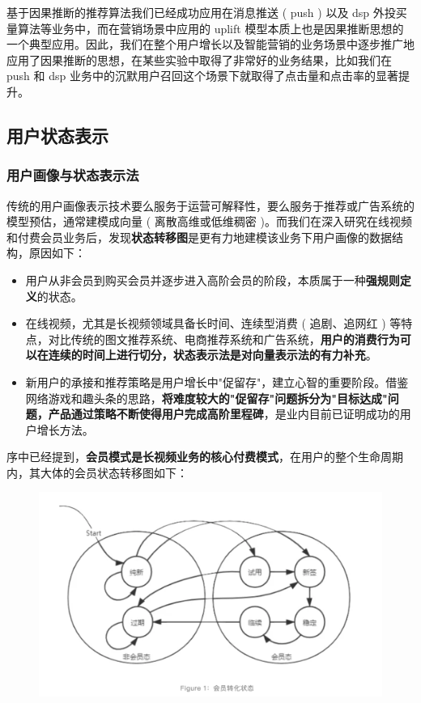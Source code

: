 \documentclass[12pt]{article}
\begin{document}
基于因果推断的推荐算法我们已经成功应用在消息推送 ( push ) 以及 dsp 外投买量算法等业务中，而在营销场景中应用的 uplift 模型本质上也是因果推断思想的一个典型应用。因此，我们在整个用户增长以及智能营销的业务场景中逐步推广地应用了因果推断的思想，在某些实验中取得了非常好的业务结果，比如我们在 push 和 dsp 业务中的沉默用户召回这个场景下就取得了点击量和点击率的显著提升。

\subsection{用户状态表示}
\subsubsection{用户画像与状态表示法}
传统的用户画像表示技术要么服务于运营可解释性，要么服务于推荐或广告系统的模型预估，通常建模成向量 ( 离散高维或低维稠密 )。而我们在深入研究在线视频和付费会员业务后，发现\textbf{状态转移图}是更有力地建模该业务下用户画像的数据结构，原因如下：
\begin{itemize}
\setlength{\itemsep}{0pt}
\setlength{\parsep}{0pt}
\setlength{\parskip}{0pt}
    \item 用户从非会员到购买会员并逐步进入高阶会员的阶段，本质属于一种\textbf{强规则定义}的状态。
    \item 在线视频，尤其是长视频领域具备长时间、连续型消费 ( 追剧、追网红 ) 等特点，对比传统的图文推荐系统、电商推荐系统和广告系统，\textbf{用户的消费行为可以在连续的时间上进行切分，状态表示法是对向量表示法的有力补充}。
    \item 新用户的承接和推荐策略是用户增长中"促留存"，建立心智的重要阶段。借鉴网络游戏和趣头条的思路，\textbf{将难度较大的"促留存"问题拆分为"目标达成"问题，产品通过策略不断使得用户完成高阶里程碑}，是业内目前已证明成功的用户增长方法。
\end{itemize}

序中已经提到，\textbf{会员模式是长视频业务的核心付费模式}，在用户的整个生命周期内，其大体的会员状态转移图如下：
\begin{figure}[H]
    \centering
    \includegraphics[width=1\textwidth]{fig/MemberStatusTransition.png}
\end{figure}
\end{document}
